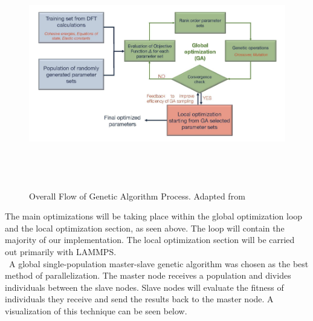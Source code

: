 \documentclass[letterpaper, 12pt]{article}
\begin{document}
\begin{flushleft}
 \begin{figure}[H]
 	\includegraphics[width=\linewidth,height=10cm,keepaspectratio]{flowchart.png}
 	\caption[Overall Flow of Genetic Algorithm Process]{Overall Flow of Genetic Algorithm Process. Adapted from \cite{C7NR06038F}}
 	\label{fig:arch}
 \end{figure}
 The main optimizations will be taking place within the global optimization loop and the local optimization section, as seen above. The loop will contain the majority of our implementation.  The local optimization section will be carried out primarily with LAMMPS.\\
 
 ~\newline A global single-population master-slave genetic algorithm was chosen as the best method of parallelization. The master node receives a population and divides individuals between the slave nodes.  Slave nodes will evaluate the fitness of individuals they receive and send the results back to the master node.  A visualization of this technique can be seen below.
 

\end{flushleft}
\end{document}
